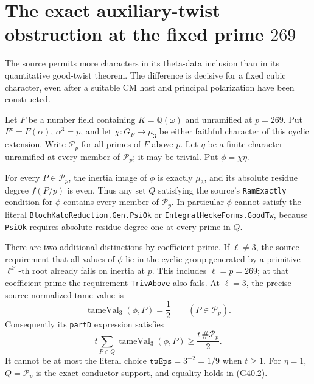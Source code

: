 \section{The exact auxiliary-twist obstruction at the fixed prime \(269\)}
\label{sec:fixed-cubic-twist-admissibility}

The source permits more characters in its theta-data inclusion
than in its quantitative good-twist theorem.  The difference is
decisive for a fixed cubic character, even after a suitable CM
host and principal polarization have been constructed.

\begin{proposition}
\label{AC-G40}
Let $F$ be a number field containing $K=\mathbb Q(\omega)$
and unramified at $p=269$.  Put
$F^{\mathrm c}=F(\alpha)$, $\alpha^3=p$, and let
$\chi:G_F\to\mu_3$ be either faithful character of this
cyclic extension.  Write $\mathcal P_p$ for all primes
of $F$ above $p$.  Let $\eta$ be a finite character
unramified at every member of $\mathcal P_p$; it may
be trivial.  Put $\phi=\chi\eta$.

For every $P\in\mathcal P_p$, the inertia image of
$\phi$ is exactly $\mu_3$, and its absolute residue
degree $f(P/p)$ is even.  Thus any set $Q$ satisfying
the source's \texttt{RamExactly} condition for $\phi$
contains every member of $\mathcal P_p$.
In particular $\phi$ cannot satisfy the literal
\texttt{BlochKatoReduction.Gen.PsiOk} or
\texttt{IntegralHeckeForms.GoodTw}, because
\texttt{PsiOk} requires absolute residue degree one
at every prime in $Q$.

There are two additional distinctions by coefficient prime.
If $\ell\ne3$, the source requirement that all values
of $\phi$ lie in the cyclic group generated by a
primitive $\ell^{k'}$-th root already fails on inertia
at $p$.  This includes $\ell=p=269$; at that coefficient
prime the requirement \texttt{TrivAbove} also fails.
At $\ell=3$, the precise source-normalized tame value is
\[
                  \operatorname{tameVal}_3(\phi,P)=\frac12
                       \qquad(P\in\mathcal P_p).              \tag{G40.1}
\]
Consequently its \texttt{partD} expression satisfies
\[
       t\sum_{P\in Q}\operatorname{tameVal}_3(\phi,P)
                         \geq\frac{t\,\#\mathcal P_p}{2}.
                                                               \tag{G40.2}
\]
It cannot be at most the literal choice
$\texttt{twEps}=3^{-2}=1/9$ when $t\geq1$.
For $\eta=1$, $Q=\mathcal P_p$ is the exact conductor
support, and equality holds in (G40.2).
\end{proposition}

